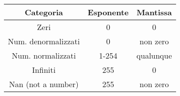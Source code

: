 \documentclass{standalone}
\newcommand\lightrule{%
	\arrayrulecolor{black!30}%
	\midrule[\lightrulewidth]%
	\arrayrulecolor{black}}
\begin{document}
\begin{tabular}{ ccc }
	\toprule
		Categoria & Esponente & Mantissa\\
	\midrule
		Zeri & 0 & 0 \\\lightrule
		Num. denormalizzati & 0 & non zero\\\lightrule
		Num. normalizzati & 1-254 & qualunque\\\lightrule
		Infiniti & 255 & 0\\\lightrule
		Nan (not a number) & 255 & non zero\\
	\bottomrule
\end{tabular}
\end{document}
